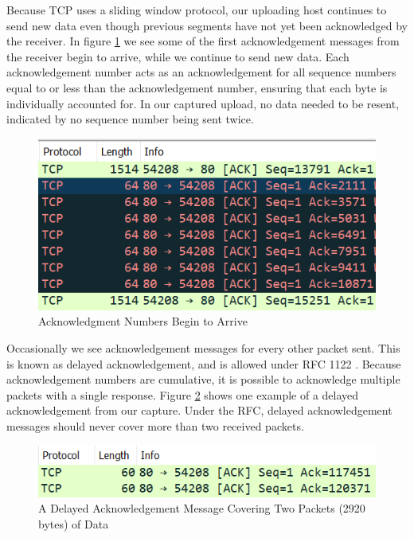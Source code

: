 \documentclass[10pt]{IEEEtran}
\begin{document}
 Because TCP uses a sliding window protocol, our uploading host continues to send new data even though previous segments have not yet been acknowledged by the receiver. In figure \ref{fig:tcpack} we see some of the first acknowledgement messages from the receiver begin to arrive, while we continue to send new data. Each acknowledgement number acts as an acknowledgement for all sequence numbers equal to or less than the acknowledgement number, ensuring that each byte is individually accounted for. In our captured upload, no data needed to be resent, indicated by no sequence number being sent twice.\\
 
 \begin{figure}[h!]
 \includegraphics[width=\linewidth]{tcpack.png}
 \caption{Acknowledgment Numbers Begin to Arrive}
 \label{fig:tcpack}
 \end{figure}
 
  Occasionally we see acknowledgement messages for every other packet sent. This is known as delayed acknowledgement, and is allowed under RFC 1122 \cite{tcp}. Because acknowledgement numbers are cumulative, it is possible to acknowledge multiple packets with a single response. Figure \ref{fig:delayedack} shows one example of a delayed acknowledgement from our capture. Under the RFC, delayed acknowledgement messages should never cover more than two received packets. \\
 
  \begin{figure}[h!]
 \includegraphics[width=\linewidth]{delayedack.png}
 \caption{A Delayed Acknowledgement Message Covering Two Packets (2920 bytes) of Data}
 \label{fig:delayedack}
 \end{figure} 
 
\end{document}

